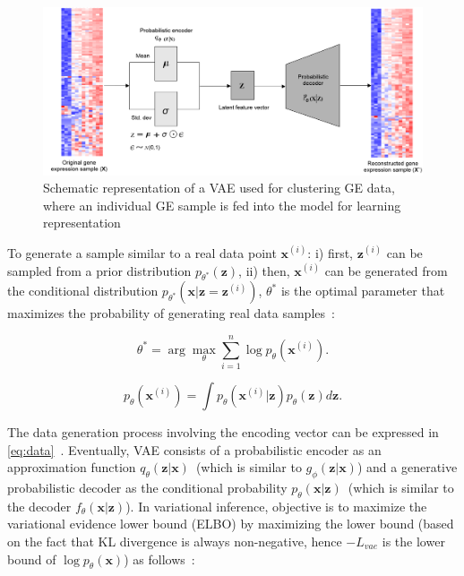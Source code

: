 \begin{figure}[h]
	\centering
	\includegraphics[scale=0.5]{images/vae.png}	
	\caption[Schematic representation of a variational autoencoder]{Schematic representation of a VAE used for clustering GE data, where an individual GE sample is fed into the model for learning representation~\cite{karimBIB2019}}	
	\label{fig:vae}
	\vspace{-4mm} 
\end{figure}

\hspace*{3.5mm} To generate a sample similar to a real data point $\mathbf{x}^{(i)}$: i) first, $\mathbf{z}^{(i)}$ can be sampled from a prior distribution $p_{\theta^{*}}(\mathbf{z})$, ii) then,  $\mathbf{x}^{(i)}$ can be generated from the conditional distribution $p_{\theta^{*}}\left(\mathbf{x} | \mathbf{z}=\mathbf{z}^{(i)}\right)$, $\theta^{*}$ is the optimal parameter that maximizes the probability of generating real data samples~\cite{VADE}:

\begin{equation}
    \theta^{*}=\arg \max _{\theta} \sum_{i=1}^{n} \log p_{\theta}\left(\mathbf{x}^{(i)}\right).
\end{equation}

\begin{equation}
    p_{\theta}\left(\mathbf{x}^{(i)}\right)=\int p_{\theta}\left(\mathbf{x}^{(i)} | \mathbf{z}\right) p_{\theta}(\mathbf{z}) d \mathbf{z}.
    \label{eq:data}
\end{equation}

\hspace*{3.5mm} The data generation process involving the encoding vector can be expressed in \cref{eq:data}~\cite{VADE}. Eventually, VAE consists of a probabilistic encoder as an approximation function $q_{\theta}(\mathbf{z} | \mathbf{x})$~(which is similar to $g_{\phi}(\mathbf{z} | \mathbf{x})$) and a generative probabilistic decoder as the conditional probability $p_{\theta}(\mathbf{x}|\mathbf{z})$~(which is similar to the decoder $f_{\theta}(\mathbf{x}|\mathbf{z})$). In variational inference, objective is to maximize the variational evidence lower bound (ELBO) by maximizing the lower bound (based on the fact that KL divergence is always non-negative, hence $-L_{vae}$ is the lower bound of $\log p_{\theta}(\mathbf{x})$) as follows~\cite{VADE}: 

